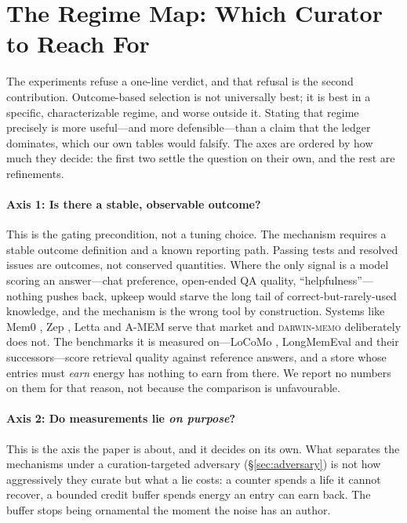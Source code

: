 \section{The Regime Map: Which Curator to Reach For}
\label{sec:regime}

The experiments refuse a one-line verdict, and that refusal is the second
contribution. Outcome-based selection is not universally best; it is
best in a specific, characterizable regime, and worse outside it. Stating
that regime precisely is more useful---and more defensible---than a claim
that the ledger dominates, which our own tables would falsify. The axes
are ordered by how much they decide: the first two settle the question on
their own, and the rest are refinements.

\paragraph{Axis 1: Is there a stable, observable outcome?}
This is the gating precondition, not a tuning choice. The mechanism
requires a stable outcome definition and a known reporting path.
Passing tests and resolved issues are outcomes, not conserved quantities. Where
the only signal is a model scoring an answer---chat preference,
open-ended QA quality, ``helpfulness''---nothing pushes back, upkeep
would starve the long tail of correct-but-rarely-used knowledge, and the
mechanism is the wrong tool by construction. Systems like Mem0
\citep{mem0}, Zep \citep{zep}, Letta \citep{letta} and A-MEM
\citep{xu2025amem} serve that market and \textsc{darwin-memo}
deliberately does not. The benchmarks it is measured on---LoCoMo
\citep{maharana2024locomo}, LongMemEval \citep{wu2024longmemeval} and
their successors---score retrieval quality against reference answers, and
a store whose entries must \emph{earn} energy has nothing to earn from
there. We report no numbers on them for that reason, not because the
comparison is unfavourable.

\paragraph{Axis 2: Do measurements lie \emph{on purpose}?}
This is the axis the paper is about, and it decides on its own. What
separates the mechanisms under a curation-targeted adversary
(\S\ref{sec:adversary}) is not how aggressively they curate but what a
lie costs: a counter spends a life it cannot recover, a bounded credit
buffer spends energy an entry can earn back. The buffer stops being
ornamental the moment the noise has an author.

